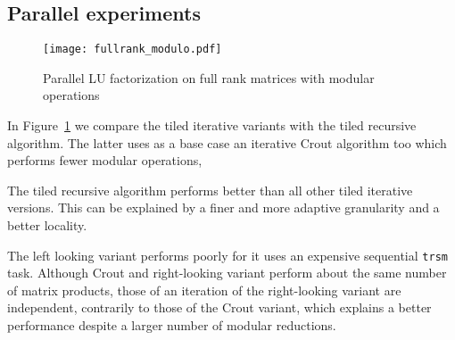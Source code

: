 \documentclass{article}
\newcommand{\trsm}{\texttt{trsm}\xspace}
\begin{document}
 
 
 
 
 
 
 
 
 
 
 

 
 
 
 
\subsection{Parallel experiments}
 
 
 
 
 
 
 
 
 
 
 
 
 
 
 
 
 
 
 

\begin{figure}[ht!]
\centering
\texttt{[image: fullrank\_modulo.pdf]}
\caption{Parallel LU factorization on full rank matrices with modular operations}
\label{fig:moduloBlockLU}
\end{figure}
In Figure~\ref{fig:moduloBlockLU} we compare the tiled iterative variants with
the tiled recursive algorithm. The latter uses as a base case an iterative Crout
algorithm too which performs fewer modular operations,
 
 
The tiled recursive algorithm performs better than all other tiled iterative
versions.
This can be explained by a finer and more adaptive  granularity and a better locality.
 
The left looking variant performs poorly for it uses an expensive sequential
\trsm task. Although Crout and right-looking variant perform about the same
number of matrix products, those of an iteration of the right-looking variant
are independent, contrarily to those of the Crout variant, which explains a
better performance despite a larger number of modular reductions.

  
 
 
 
 
 
 
 
 
 
 
 
 
 
\end{document}
